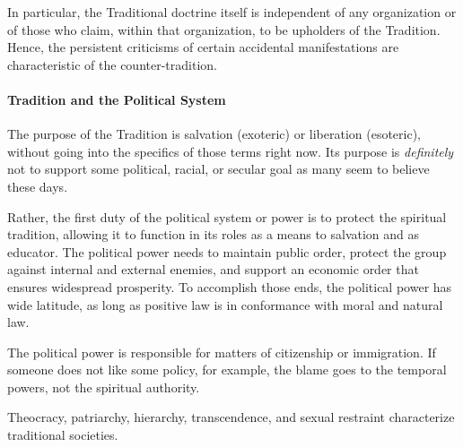 In particular, the Traditional doctrine itself is independent of any organization or of those who claim, within that organization, to be upholders of the Tradition. Hence, the persistent criticisms of certain accidental manifestations are characteristic of the counter-tradition.

\paragraph{Tradition and the Political System}
The purpose of the Tradition is salvation (exoteric) or liberation (esoteric), without going into the specifics of those terms right now. Its purpose is \emph{definitely} not to support some political, racial, or secular goal as many seem to believe these days.

Rather, the first duty of the political system or power is to protect the spiritual tradition, allowing it to function in its roles as a means to salvation and as educator. The political power needs to maintain public order, protect the group against internal and external enemies, and support an economic order that ensures widespread prosperity. To accomplish those ends, the political power has wide latitude, as long as positive law is in conformance with moral and natural law.

The political power is responsible for matters of citizenship or immigration. If someone does not like some policy, for example, the blame goes to the temporal powers, not the spiritual authority.

Theocracy, patriarchy, hierarchy, transcendence, and sexual restraint characterize traditional societies.

